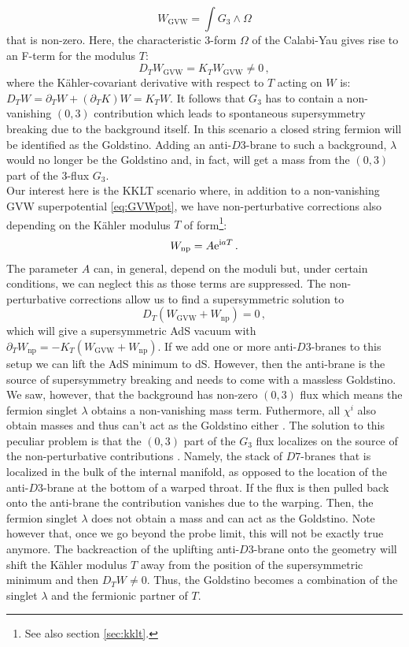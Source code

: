 \documentclass[12pt]{report}
\newcommand{\be}{\begin{equation}}
\newcommand{\ee}{\end{equation}}
\def\rmi{{\rm i}}
\def\rme{{\rm e}}
\begin{document}
\be 
W_{\text{GVW}} = \int G_3 \wedge \Omega
\label{eq:GVWpot}
\ee
that is non-zero. Here, the characteristic 3-form $\Omega$ of the Calabi-Yau gives rise to an F-term for the modulus $T$:
\be 
D_T W_{\text{GVW}} = K_T W_{\text{GVW}} \neq 0\,,
\ee
where the Kähler-covariant derivative with respect to $T$ acting on $W$ is: $D_T W = \partial_T W + (\partial_T K ) W = K_T W$. It follows that $G_3$ has to contain a non-vanishing $(0,3)$ contribution which leads to spontaneous supersymmetry breaking due to the background itself. In this scenario a closed string fermion will be identified as the Goldstino. Adding an anti-$D3$-brane to such a background, $\lambda$ would no longer be the Goldstino and, in fact, will get a mass from the $(0,3)$ part of the 3-flux $G_3$.\\
Our interest here is the KKLT scenario where, in addition to a non-vanishing GVW superpotential \eqref{eq:GVWpot}, we have non-perturbative corrections also depending on the Kähler modulus $T$ of form\footnote{See also section \ref{sec:kklt}.}:
\be 
W_{\text{np}} = A \rme^{\rmi a T}\,.
\ee
The parameter $A$ can, in general, depend on the moduli but, under certain conditions, we can neglect this as those terms are suppressed. The non-perturbative corrections allow us to find a supersymmetric solution to 
\be 
D_T \left( W_{\text{GVW}} + W_{\text{np}} \right)=0\,,
\ee
which will give a supersymmetric AdS vacuum with $\partial_T W_{\text{np}} = - K_T (W_{\text{GVW}} + W_{\text{np}})$. If we add one or more anti-$D3$-branes to this setup we can lift the AdS minimum to dS. However, then the anti-brane is the source of supersymmetry breaking and needs to come with a massless Goldstino. We saw, however, that the background has non-zero $(0,3)$ flux which means the fermion singlet $\lambda$ obtains a non-vanishing mass term. Futhermore, all $\chi^i$ also obtain masses and thus can't act as the Goldstino either \cite{Bergshoeff:2015jxa}. The solution to this peculiar problem is that the $(0,3)$ part of the $G_3$ flux localizes on the source of the non-perturbative contributions \cite{Baumann:2010sx,Dymarsky:2010mf}. Namely, the stack of $D7$-branes that is localized in the bulk of the internal manifold, as opposed to the location of the anti-$D3$-brane at the bottom of a warped throat. If the flux is then pulled back onto the anti-brane the contribution vanishes due to the warping. Then, the fermion singlet $\lambda$ does not obtain a mass and can act as the Goldstino. Note however that, once we go beyond the probe limit, this will not be exactly true anymore. The backreaction of the uplifting anti-$D3$-brane onto the geometry will shift the Kähler modulus $T$ away from the position of the supersymmetric minimum and then $D_TW\neq0$. Thus, the Goldstino becomes a combination of the singlet $\lambda$ and the fermionic partner of $T$.\\
\end{document}
